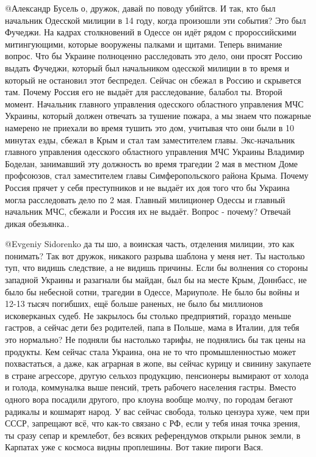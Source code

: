 \begin{multicols}{2}
\begin{itemize}
@Александр Бусель  о, дружок, давай по поводу убийтсв. И так, кто был
начальник Одесской милиции в 14 году, когда произошли эти события? Это был
Фучеджи. На кадрах столкновений в Одессе он идёт рядом с пророссийскими
митингующими, которые вооружены палками и щитами. Теперь внимание вопрос. Что
бы Украине полноценно расследовать это дело, они просят Россию выдать Фучеджи,
который был начальником одесской милиции в то время и который не остановил
этот беспредел. Сейчас он сбежал в Россию и скрывется там. Почему Россия его
не выдаёт для расследование, балабол ты. Второй момент. Начальник главного
управления одесского областного управления МЧС Украины, который должен
отвечать за тушение пожара, а мы знаем что пожарные намерено не приехали во
время тушить это дом, учитывая что они были в 10 минутах езды, сбежал в Крым и
стал там заместителем главы. Экс-начальник главного управления одесского
областного управления МЧС Украины Владимир Боделан, занимавший эту должность
во время трагедии 2 мая в местном Доме профсоюзов, стал заместителем главы
Симферопольского района Крыма. Почему Россия прячет у себя преступников и не
выдаёт их доя того что бы Украина могла расследовать дело по 2 мая. Главный
милиционер Одессы и главный начальник МЧС, сбежали и Россия их не выдаёт.
Вопрос - почему? Отвечай дикая обезьянка.. 


@Evgeniy Sidorenko  да ты шо, а воинская часть, отделения милиции, это как
понимать? Так вот дружок, никакого разрыва шаблона у меня нет. Ты настолько
туп, что видишь следствие, а не видишь причины. Если бы волнения со стороны
западной Украины и разагнали бы майдан, был бы на месте Крым, Доннбасс, не
было бы небесной сотни, трагедии в Одессе, Мариуполе. Не было бы войны и 12-13
тысяч погибших, ещё больше раненых, не было бы миллионов исковерканых судеб.
Не закрылось бы столько предприятий, гораздо меньше гастров, а сейчас дети без
родителей, папа в Польше, мама в Италии, для тебя это нормально? Не подняли бы
настолько тарифы, не поднялись бы так цены на продукты. Кем сейчас стала
Украина, она не то что промышленностью может похвастаться, а даже, как
аграрная в жопе, вы сейчас курицу и свинину закупаете в стране агрессоре,
другую сельхоз продукцию, пенсионеры вымирают от холода и голода, коммуналка
выше пенсий, треть рабочего населения гастры. Вместо одного вора посадили
другого, про клоуна вообще молчу, по городам бегают радикалы и кошмарят народ.
У вас сейчас свобода, только цензура хуже, чем при СССР, запрещают всё, что
как-то связано с РФ, если у тебя иная точка зрения, ты сразу сепар и
кремлебот, без всяких референдумов открыли рынок земли, в Карпатах уже с
космоса видны проплешины. Вот такие пироги Вася.


\end{itemize}
\end{multicols}
